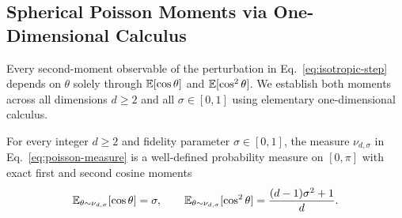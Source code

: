 \subsection{Spherical Poisson Moments via One-Dimensional Calculus}
\label{sec:poisson-moments}

Every second-moment observable of the perturbation in Eq.~\eqref{eq:isotropic-step} depends on $\theta$ solely through $\mathbb{E}[\cos\theta]$ and $\mathbb{E}[\cos^2\theta]$. We establish both moments across all dimensions $d \ge 2$ and all $\sigma \in [0, 1]$ using elementary one-dimensional calculus.

\begin{theorem}
\label{thm:poisson-moments}
For every integer $d \ge 2$ and fidelity parameter $\sigma \in [0, 1]$, the measure $\nu_{d,\sigma}$ in Eq.~\eqref{eq:poisson-measure} is a well-defined probability measure on $[0, \pi]$ with exact first and second cosine moments
\begin{equation}
\mathbb{E}_{\theta \sim \nu_{d,\sigma}}[\cos\theta] = \sigma, \qquad \mathbb{E}_{\theta \sim \nu_{d,\sigma}}[\cos^2\theta] = \frac{(d - 1)\sigma^2 + 1}{d}.
\label{eq:poisson-moments}
\end{equation}
\end{theorem}

